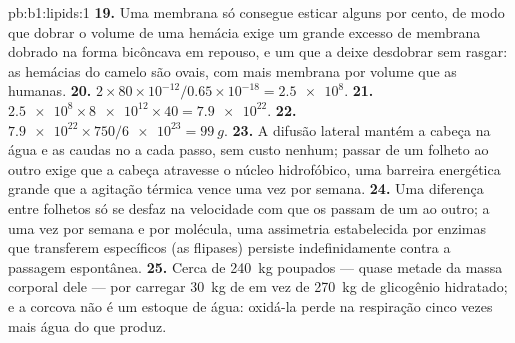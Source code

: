 \begin{solution}{pb:b1:lipids:1}
\textbf{19.} Uma membrana só consegue esticar alguns por cento, de modo
que dobrar o volume de uma hemácia exige um grande excesso de membrana
dobrado na forma bicôncava em repouso, e um  que a deixe
desdobrar sem rasgar: as hemácias do camelo são ovais, com mais membrana
por volume que as humanas.
\textbf{20.} $2\times 80\times 10^{-12}/0.65\times 10^{-18} = \num{2.5e8}$.
\textbf{21.} $\num{2.5e8}\times\num{8e12}\times 40 = \num{7.9e22}$.
\textbf{22.} $\num{7.9e22}\times 750/\num{6e23} = \qty{99}{g}$.
\textbf{23.} A difusão lateral mantém a cabeça na água e as caudas no
 a cada passo, sem custo nenhum; passar de um folheto ao outro exige
que a cabeça  atravesse o núcleo hidrofóbico, uma barreira
energética grande que a agitação térmica vence uma vez por semana.
\textbf{24.} Uma diferença entre folhetos só se desfaz na velocidade com
que os  passam de um ao outro; a uma vez por semana e por
molécula, uma assimetria estabelecida por enzimas que transferem
 específicos (as flipases) persiste indefinidamente contra a
passagem espontânea.
\textbf{25.} Cerca de \qty{240}{kg} poupados --- quase metade da massa
corporal dele --- por carregar \qty{30}{kg} de  em vez de
\qty{270}{kg} de glicogênio hidratado; e a corcova não é um estoque de
água: oxidá-la perde na respiração cinco vezes mais água do que produz.
\end{solution}

